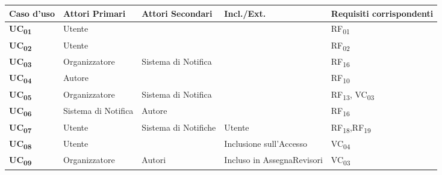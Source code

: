 \begin{tabular}{|p{2cm}|p{2cm}|p{2cm}|p{2cm}|p{2cm}|}
  \hline
  \rowcolor{SkyBlue}
  Caso d'uso & Attori Primari & Attori Secondari & Incl./Ext. & Requisiti corrispondenti \\
  \hline
  \hline
  \textbf{UC\textsubscript{01}}& Utente & & & RF\textsubscript{01} \\
  \hline
  \textbf{UC\textsubscript{02}} & Utente & & & RF\textsubscript{02} \\
  \hline
  \textbf{UC\textsubscript{03}} & Organizzatore & Sistema di Notifica & & RF\textsubscript{16} \\
  \hline
  \textbf{UC\textsubscript{04}} & Autore & & & RF\textsubscript{10} \\
  \hline
  \textbf{UC\textsubscript{05}} & Organizzatore & Sistema di Notifica&  & RF\textsubscript{13}, VC\textsubscript{03} \\
  \hline
  \textbf{UC\textsubscript{06}} & Sistema di Notifica & Autore & & RF\textsubscript{16}\\
  \hline
 \textbf{UC\textsubscript{07}} & Utente &  Sistema di Notifiche & Utente & RF\textsubscript{18},RF\textsubscript{19}\\
  \hline
 \textbf{UC\textsubscript{08}} & Utente &  & Inclusione sull'Accesso& VC\textsubscript{04}\\
  \hline
  \textbf{UC\textsubscript{09}} & Organizzatore & Autori & Incluso in AssegnaRevisori & VC\textsubscript{03} \\
  \hline
\end{tabular}
